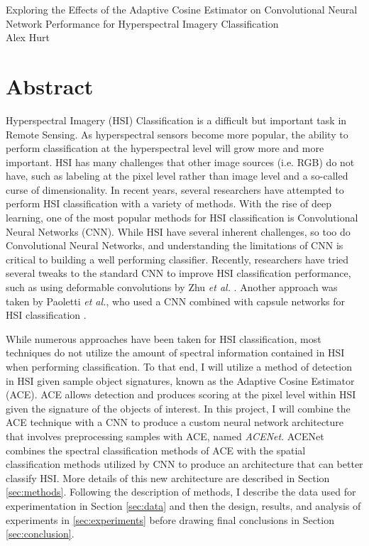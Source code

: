 \documentclass[12pt]{article}
\begin{document}
	
\begin{center}
	\huge{Exploring the Effects of the Adaptive Cosine Estimator on Convolutional Neural Network Performance for Hyperspectral Imagery Classification} \\
	\vspace{5mm}
	\large{Alex Hurt}
\end{center}

%
\section{Abstract}

Hyperspectral Imagery (HSI) Classification is a difficult but important task in Remote Sensing.
%
As hyperspectral sensors become more popular, the ability to perform classification at the hyperspectral level will grow more and more important.
%
HSI has many challenges that other image sources (i.e. RGB) do not have, such as labeling at the pixel level rather than image level and a so-called curse of dimensionality.
%
In recent years, several researchers have attempted to perform HSI classification with a variety of methods.
%
With the rise of deep learning, one of the most popular methods for HSI classification is Convolutional Neural Networks (CNN).
%
While HSI have several inherent challenges, so too do Convolutional Neural Networks, and understanding the limitations of CNN is critical to building a well performing classifier.
%
Recently, researchers have tried several tweaks to the standard CNN to improve HSI classification performance, such as using deformable convolutions by Zhu \textit{et al.} \cite{zhu_deformable_2018}. 
%
Another approach was taken by Paoletti \textit{et al.}, who used a CNN combined with capsule networks for HSI classification \cite{paoletti_capsule_2018}.

While numerous approaches have been taken for HSI classification, most techniques do not utilize the amount of spectral information contained in HSI when performing classification.
%
To that end, I will utilize a method of detection in HSI given sample object signatures, known as the Adaptive Cosine Estimator (ACE).
%
ACE allows detection and produces scoring at the pixel level within HSI given the signature of the objects of interest. 
%
In this project, I will combine the ACE technique with a CNN to produce a custom neural network architecture that involves preprocessing samples with ACE, named \textit{ACENet}.
%
ACENet combines the spectral classification methods of ACE with the spatial classification methods utilized by CNN to produce an architecture that can better classify HSI.
%
More details of this new architecture are described in Section \ref{sec:methods}.
%
Following the description of methods, I describe the data used for experimentation in Section \ref{sec:data} and then the design, results, and analysis of experiments in \ref{sec:experiments} before drawing final conclusions in Section \ref{sec:conclusion}.
\end{document}

